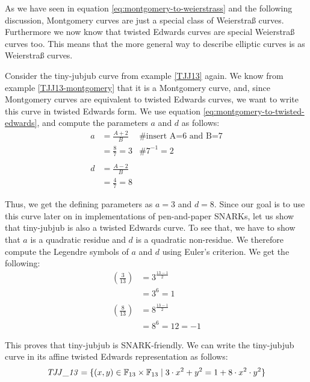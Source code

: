 As we have seen in equation \ref{eq:montgomery-to-weierstrass} and the following discussion,  Montgomery curves are just a special class of Weierstraß curves. Furthermore we now know that twisted Edwards curves are special Weierstraß curves too. This means that the more general way to describe elliptic curves is as Weierstraß curves.

\begin{example}Consider the tiny-jubjub curve from example \ref{TJJ13} again. We know from example \ref{TJJ13-montgomery} that it is a Montgomery curve, and, since Montgomery curves are equivalent to twisted Edwards curves, we want to write this curve in twisted Edwards form. We use equation \ref{eq:montgomery-to-twisted-edwards}, and compute the parameters $a$ and $d$ as follows:
\begin{align*}
a & = \frac{A+2}{B} & \text{\# insert A=6 and B=7}\\
  & = \frac{8}{7} = 3 & \text{\# } 7^{-1}= 2 \\
  \\
d & = \frac{A-2}{B} \\
  & = \frac{4}{7} = 8 
\end{align*}

Thus, we get the defining parameters as $a= 3$ and $d=8$. Since our goal is to use this curve later on in implementations of pen-and-paper SNARKs, let us show that tiny-jubjub is also a  twisted Edwards curve. To see that, we  have to show that $a$ is a quadratic residue and $d$ is a quadratic non-residue. We therefore compute the Legendre symbols of $a$ and $d$ using Euler's criterion. We get the following:
\begin{align*}
\left(\frac{3}{13}\right) &= 3^{\frac{13-1}{2}} \\
                          & = 3^6 
                            = 1\\
                          \\
\left(\frac{8}{13}\right) &= 8^{\frac{13-1}{2}} \\
                          & = 8^6 
                            = 12
                            = -1                     
\end{align*}

This proves that tiny-jubjub is SNARK-friendly. We can write the tiny-jubjub curve in its affine twisted Edwards representation as follows:
\begin{equation}\label{TJJ13-twisted-edwards}
\mathit{TJJ\_13} = \{(x,y)\in \mathbb{F}_{13}\times \mathbb{F}_{13}\;|\; 3\cdot x^{2} + y^2 =1+ 8\cdot x^{2}\cdot y^2 \}
\end{equation}


\end{example}
